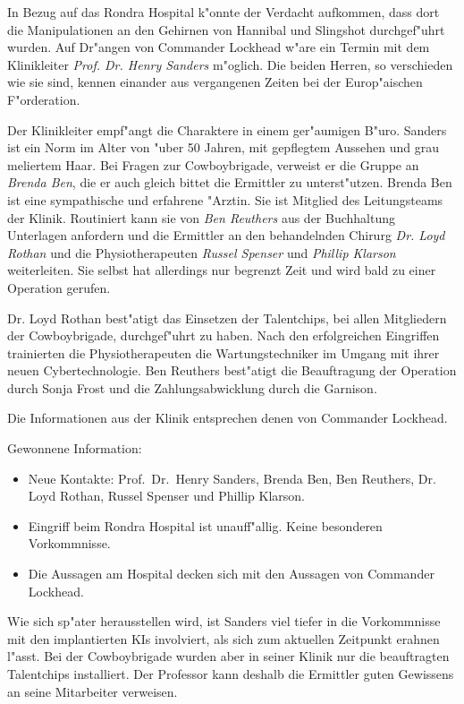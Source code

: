 
In Bezug auf das Rondra Hospital k"onnte der Verdacht aufkommen, dass dort die Manipulationen an den Gehirnen von Hannibal und Slingshot durchgef"uhrt wurden. Auf Dr"angen von Commander Lockhead w"are ein Termin mit dem Klinikleiter \emph{Prof. Dr. Henry Sanders} m"oglich. Die beiden Herren, so verschieden wie sie sind, kennen einander aus vergangenen Zeiten bei der Europ"aischen F"orderation.

Der Klinikleiter empf"angt die Charaktere in einem ger"aumigen B"uro. Sanders ist ein Norm im Alter von "uber 50 Jahren, mit gepflegtem Aussehen und grau meliertem Haar. Bei Fragen zur Cowboybrigade, verweist er die Gruppe an \emph{Brenda Ben}, die er auch gleich bittet die Ermittler zu unterst"utzen. Brenda Ben ist eine sympathische und erfahrene "Arztin. Sie ist Mitglied des Leitungsteams der Klinik. Routiniert kann sie von \emph{Ben Reuthers} aus der Buchhaltung Unterlagen anfordern und die Ermittler an den behandelnden Chirurg \emph{Dr. Loyd Rothan} und die Physiotherapeuten \emph{Russel Spenser} und \emph{Phillip Klarson} weiterleiten. Sie selbst hat allerdings nur begrenzt Zeit und wird bald zu einer Operation gerufen.

Dr. Loyd Rothan best"atigt das Einsetzen der Talentchips, bei allen Mitgliedern der Cowboybrigade, durchgef"uhrt zu haben. Nach den erfolgreichen Eingriffen trainierten die Physiotherapeuten die Wartungstechniker im Umgang mit ihrer neuen Cybertechnologie. Ben Reuthers best"atigt die Beauftragung der Operation durch Sonja Frost und die Zahlungsabwicklung durch die Garnison.

Die Informationen aus der Klinik entsprechen denen von Commander Lockhead.

\begin{remarks}
	Gewonnene Information: 
	
	\begin{itemize}
		\item Neue Kontakte: Prof.~Dr.~Henry Sanders, Brenda Ben, Ben Reuthers, Dr. Loyd Rothan, Russel Spenser und Phillip Klarson.
		\item Eingriff beim Rondra Hospital ist unauff"allig. Keine besonderen Vorkommnisse.
		\item Die Aussagen am Hospital decken sich mit den Aussagen von Commander Lockhead.
	\end{itemize}

	Wie sich sp"ater herausstellen wird, ist Sanders viel tiefer in die Vorkommnisse mit den implantierten KIs involviert, als sich zum aktuellen Zeitpunkt erahnen l"asst. Bei der Cowboybrigade wurden aber in seiner Klinik nur die beauftragten Talentchips installiert. Der Professor kann deshalb die Ermittler guten Gewissens an seine Mitarbeiter verweisen.
\end{remarks}

